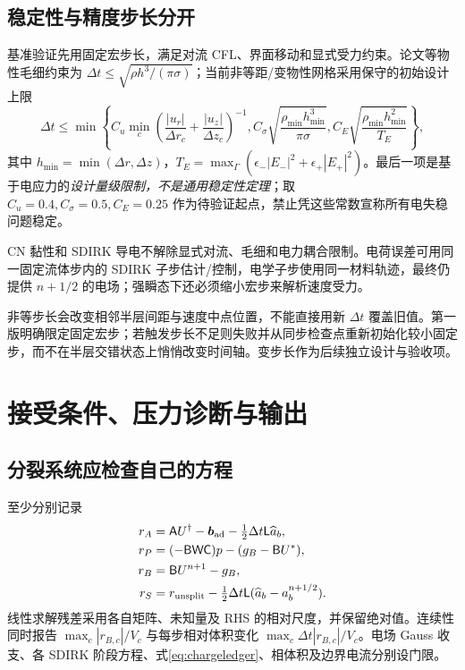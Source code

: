 \documentclass[UTF8,a4paper,11pt,fontset=fandol]{ctexart}
\numberwithin{equation}{section}
\newcommand{\dt}{\Delta t}\newcommand{\dd}{\,\mathrm d}
\newcommand{\mat}[1]{\mathsf{#1}}\newcommand{\code}[1]{\nolinkurl{#1}}
\begin{document}
\subsection{稳定性与精度步长分开}
基准验证先用固定宏步长，满足对流 CFL、界面移动和显式受力约束。论文等物性毛细约束为 $\dt\le\sqrt{\rho h^3/(\pi\sigma)}$；当前非等距/变物性网格采用保守的初始设计上限
\begin{equation}
 \dt\le\min\left\{C_u\min_c\left(\frac{|u_r|}{\Delta r_c}+\frac{|u_z|}{\Delta z_c}\right)^{-1},
 C_\sigma\sqrt{\frac{\rho_{\min}h_{\min}^3}{\pi\sigma}},
 C_E\sqrt{\frac{\rho_{\min}h_{\min}^2}{T_E}}\right\},
\end{equation}
其中 $h_{\min}=\min(\Delta r,\Delta z)$，$T_E=\max_\Gamma(\epsilon_-|E_-|^2+\epsilon_+|E_+|^2)$。最后一项是基于电应力的\emph{设计量级限制，不是通用稳定性定理}；取 $C_u=0.4,C_\sigma=0.5,C_E=0.25$ 作为待验证起点，禁止凭这些常数宣称所有电失稳问题稳定。

CN 黏性和 SDIRK 导电不解除显式对流、毛细和电力耦合限制。电荷误差可用同一固定流体步内的 SDIRK 子步估计/控制，电学子步使用同一材料轨迹，最终仍提供 $n+1/2$ 的电场；强瞬态下还必须缩小宏步来解析速度受力。

非等步长会改变相邻半层间距与速度中点位置，不能直接用新 $\dt$ 覆盖旧值。第一版明确限定固定宏步；若触发步长不足则失败并从同步检查点重新初始化较小固定步，而不在半层交错状态上悄悄改变时间轴。变步长作为后续独立设计与验收项。

\clearpage
\section{接受条件、压力诊断与输出}
\subsection{分裂系统应检查自己的方程}
至少分别记录
\begin{align}
 r_A&=\mat A U^\dagger-\bb_{\rm ad}-\tfrac12\dt\mat L\widehat a_b,\\
 r_P&=(-\mat B\mat W\mat C)p-(g_B-\mat BU^*),\\
 r_B&=\mat BU^{n+1}-g_B,\\
 r_S&=r_{\rm unsplit}-\tfrac12\dt\mat L(\widehat a_b-a_b^{n+1/2}).
\end{align}
线性求解残差采用各自矩阵、未知量及 RHS 的相对尺度，并保留绝对值。连续性同时报告 $\max_c|r_{B,c}|/V_c$ 与每步相对体积变化 $\max_c\dt|r_{B,c}|/V_c$。电场 Gauss 收支、各 SDIRK 阶段方程、式\eqref{eq:chargeledger}、相体积及边界电流分别设门限。
\end{document}
